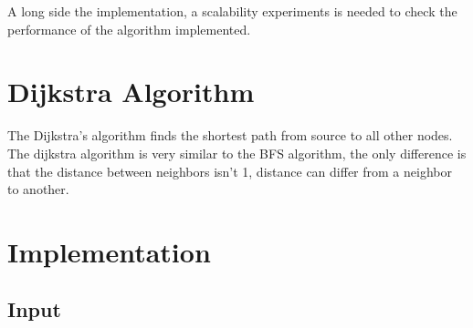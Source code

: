 \documentclass[english]{article}
\begin{document}
A long side the implementation, a scalability experiments is needed to check the performance of the algorithm implemented.

\section{Dijkstra Algorithm}
The Dijkstra’s algorithm finds the shortest path from source to all other nodes. The dijkstra algorithm is very similar to the BFS algorithm, the only difference is that the distance between neighbors isn't 1, distance can differ from a neighbor to another.

\newpage

\section{Implementation}

\subsection{Input}
\end{document}
